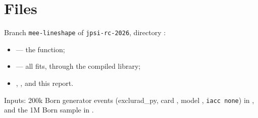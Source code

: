 \documentclass[11pt]{article}
\begin{document}
\section*{Files}
Branch \texttt{mee-lineshape} of \texttt{jpsi-rc-2026}, directory :
\begin{itemize}
\item {} --- the function;
\item {} --- all fits, through the compiled library;
\item {}, ,  and this report.
\end{itemize}
Inputs: 200k Born generator events (exclurad\_py, card , model
, \texttt{iacc none}) in
, and the 1M Born sample in
.
\end{document}
